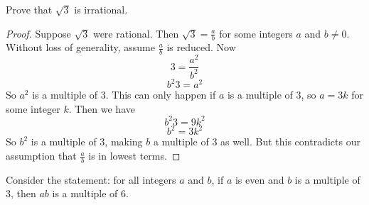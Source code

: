 \begin{questions}
 \question Prove that $\sqrt 3$ is irrational.
 
   \begin{answer}
     \begin{proof}
      Suppose $\sqrt{3}$ were rational.  Then $\sqrt{3} = \frac{a}{b}$ for some integers $a$ and $b \ne 0$.  Without loss of generality, assume $\frac{a}{b}$ is reduced.  Now
 \[3 = \frac{a^2}{b^2}\]
 \[b^2 3 = a^2\]
 So $a^2$ is a multiple of 3.  This can only happen if $a$ is a multiple of 3, so $a = 3k$ for some integer $k$.  Then we have
 \[b^2 3 = 9k^2\]
 \[b^2 = 3k^2\]
 So $b^2$ is a multiple of 3, making $b$ a multiple of 3 as well.  But this contradicts our assumption that $\frac{a}{b}$ is in lowest terms.
     \end{proof}
   \end{answer}


   
   
   
 \question Consider the statement: for all integers $a$ and $b$, if $a$ is even and $b$ is a multiple of 3, then $ab$ is a multiple of 6.
	
	\begin{answer}
	\end{answer}
 

\end{questions}
